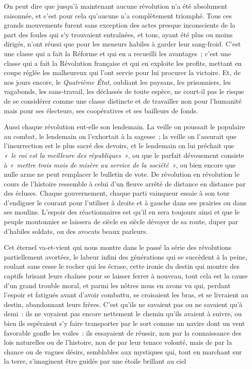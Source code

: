 \documentclass[french,twoside]{book} %
\begin{document}
On peut dire que jusqu’à maintenant aucune révolution n’a été absolument raisonnée, et c’est pour cela qu’aucune  n’a complètement triomphé. Tous ces grands mouvements furent sans exception des actes presque inconscients de la part des foules qui s’y trouvaient entraînées, et tous, ayant été plus ou moins dirigés, n’ont réussi que pour les meneurs habiles à garder leur sang-froid. C’est une classe qui a fait la Réforme et qui en a recueilli les avantages ; c’est une classe qui a fait la Révolution française et qui en exploite les profits, mettant en coupe réglée les malheureux qui l’ont servie pour lui procurer la victoire. Et, de nos jours encore, le \emph{Quatrième État}, oubliant les paysans, les prisonniers, les vagabonds, les sans-travail, les déclassés de toute espèce, ne court-il pas le risque de se considérer comme une classe distincte et de travailler non pour  l’humanité mais pour ses électeurs, ses coopératives et ses bailleurs de fonds.\par
Aussi chaque révolution eut-elle son lendemain. La veille on poussait le populaire au combat, le lendemain on l’exhortait à la sagesse ; la veille on l’assurait que l’insurrection est le plus sacré des devoirs, et le lendemain on lui prêchait que \emph{« le roi est la meilleure des républiques »}, ou que le parfait dévouement consiste à \emph{« mettre trois mois de misère au service de la société »}, ou bien encore que nulle arme ne peut remplacer le bulletin de vote. De révolution en révolution le cours de l’histoire ressemble à celui d’un fleuve arrêté de distance en distance par des écluses. Chaque gouvernement, chaque parti vainqueur essaie à son tour d’endiguer  le courant pour l’utiliser à droite et à gauche dans ses prairies ou dans ses moulins. L’espoir des réactionnaires est qu’il en sera toujours ainsi et que le peuple moutonnier se laissera de siècle en siècle dévoyer de sa route, duper par d’habiles soldats, ou des avocats beaux parleurs.\par
Cet éternel va-et-vient qui nous montre dans le passé la série des révolutions partiellement avortées, le labeur infini des générations qui se succèdent à la peine, roulant sans cesse le rocher qui les écrase, cette ironie du destin qui montre des captifs brisant leurs chaînes pour se laisser ferrer à nouveau, tout cela est la cause d’un grand trouble moral, et parmi les nôtres nous en avons vu qui, perdant l’espoir et fatigués  avant d’avoir combattu, se croisaient les bras, et se livraient au destin, abandonnant leurs frères. C’est qu’ils ne savaient pas ou ne savaient qu’à demi : ils ne voyaient pas encore nettement le chemin qu’ils avaient à suivre, ou bien ils espéraient s’y faire transporter par le sort comme un navire dont un vent favorable gonfle les voiles : ils essayaient de réussir, non par la connaissance des lois naturelles ou de l’histoire, non de par leur tenace volonté, mais de par la chance ou de vagues désirs, semblables aux mystiques qui, tout en marchant sur la terre, s’imaginent être guidés par une étoile brillant au ciel\par
\end{document}
